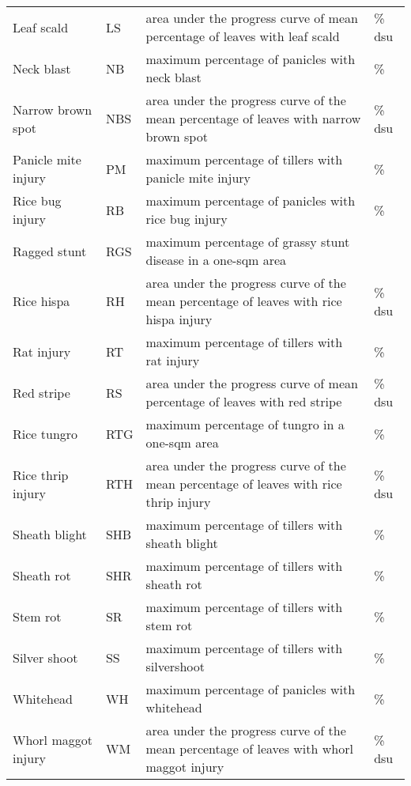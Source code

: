 \begin{landscape}
\begin{table}[!h]
\begin{tabular}{llll}
Leaf scald            & LS      & area under the progress curve of mean percentage of leaves with leaf scald                & \% dsu \\
Neck blast            & NB      & maximum percentage of panicles with neck blast                                            & \%     \\
Narrow brown spot     & NBS     & area under the progress curve of the mean percentage of leaves with narrow brown spot     & \% dsu \\
Panicle mite  injury          & PM      & maximum percentage of tillers with panicle mite injury                                    & \%     \\
Rice bug injury       & RB      & maximum percentage of panicles with rice bug injury                                       & \%     \\
Ragged stunt     & RGS     & maximum percentage of grassy stunt disease in a one-sqm area                              &        \\
Rice hispa            & RH      & area under the progress curve of the mean percentage of leaves with rice hispa injury     & \% dsu \\
Rat injury            & RT      & maximum percentage of tillers with rat injury                                             & \%     \\
Red stripe            & RS      & area under the progress curve of mean percentage of leaves with red stripe                & \% dsu \\
Rice tungro           & RTG     & maximum percentage of tungro in a one-sqm area                                            & \%     \\
Rice thrip injury           & RTH     & area under the progress curve of the mean percentage of leaves with rice thrip injury     & \% dsu \\
Sheath blight         & SHB     & maximum percentage of tillers with sheath blight                                          & \%     \\
Sheath rot            & SHR     & maximum percentage of tillers with sheath rot                                             & \%     \\
Stem rot              & SR      & maximum percentage of tillers with stem rot                                               & \%     \\
Silver shoot          & SS      & maximum percentage of tillers with silvershoot                                            & \%     \\
Whitehead             & WH      & maximum percentage of panicles with whitehead                                             & \%     \\
Whorl maggot injury         & WM      & area under the progress curve of the mean percentage of leaves with whorl maggot injury   & \% dsu \\
\hline
\end{tabular}
\end{table}
\end{landscape}